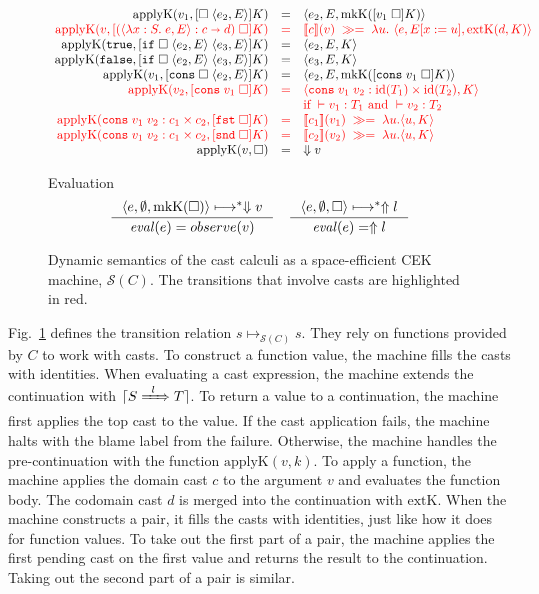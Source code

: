 \documentclass[runningheads]{llncs}
\newcommand{\infr}[2]{\inference{#1}{#2}}
\newcommand{\highlight}[1]{{\color{red} #1}}
\newcommand{\sidecond}[1]{\text{if}\;#1}
\newcommand{\figequalto}[3]{#1 & = & #2 & #3 \\}
\newcommand{\figequaltoH}[3]{\highlight{#1} & \highlight{=} & \highlight{#2} & 
\highlight{#3} \\}
\newcommand{\figref}[1]{Fig.~\ref{#1}}
\newcommand{\SMachine}[1]{\ensuremath{\mathcal{S}(#1)}}
\newcommand{\error}[1]{\ensuremath{\Uparrow#1}}
\newcommand{\Pfunc}[2]{\ensuremath{#1 \shortrightarrow #2}}
\newcommand{\Pprod}[2]{\ensuremath{#1 \times #2}}
\newcommand{\elam}[3]{\lambda#1:#2.\;#3}
\newcommand{\eapp}[2]{#1\;#2}
\newcommand{\eif}[3]{\mathtt{if}\;#1\;#2\;#3}
\newcommand{\econs}[2]{\mathtt{cons} \; #1 \; #2}
\newcommand{\efst}[1]{\mathtt{fst} \; #1}
\newcommand{\esnd}[1]{\mathtt{snd} \; #1}
\newcommand{\ecast}[2]{\ensuremath{#1 : #2}}
\newcommand{\ccast}[3]{#1 \xRightarrow[]{\enskip #2 \enskip} #3}
\newcommand{\vtrue}[0]{\mathtt{true}}
\newcommand{\vfalse}[0]{\mathtt{false}}
\newcommand{\vfunc}[4]{\langle\elam{#1}{#2}{#3},#4\rangle}
\newcommand{\vcons}[2]{\econs{#1}{#2}}
\newcommand{\sexpr}[3]{\ensuremath{\langle#1,#2,#3\rangle}}
\newcommand{\scont}[2]{\ensuremath{\langle#1,#2\rangle}}
\newcommand{\shalt}[1]{\ensuremath{\Downarrow #1}}
\newcommand{\Knil}[0]{\Box}
\newcommand{\Kcons}[2]{[#1]#2}
\newcommand{\closure}[2]{\langle#1,#2\rangle}
\newcommand{\FappXO}[2]{\eapp{\square}{\closure{#1}{#2}}}
\newcommand{\FappOX}[1]{\eapp{#1}{\square}}
\newcommand{\Fif}[3]{\eif{\square}{\closure{#1}{#3}}{\closure{#2}{#3}}}
\newcommand{\FconsXO}[2]{\econs{\square}{\closure{#1}{#2}}}
\newcommand{\FconsOX}[1]{\econs{#1}{\square}}
\newcommand{\Ffst}[0]{\efst{\square}}
\newcommand{\Fsnd}[0]{\esnd{\square}}
\newcommand{\mbind}[0]{\ensuremath{\;\gg=\;}}
\newcommand{\denote}[1]{\ensuremath{\llbracket #1 \rrbracket}}
\newcommand{\translate}[1]{\ensuremath{\lceil#1\rceil}}
\newcommand{\id}[1]{\ensuremath{\mathrm{id}(#1)}}
\newcommand{\mkCont}[1]{\ensuremath{\mathrm{mkK}(#1)}}
\newcommand{\extCont}[2]{\ensuremath{\mathrm{extK}(#1,#2)}}
\newcommand{\applyCont}[2]{\ensuremath{\mathrm{applyK}(#1,#2)}}
\newcommand{\valuetyping}[2]{\ensuremath{\vdash #1 : #2}}
\newcommand{\casttyping}[3]{\ensuremath{\vdash #1 : #2 \Longrightarrow #3}}
\newcommand{\transitivelyreduceto}[2]{\ensuremath{#1 \longmapsto^{*} #2}}
\newcommand{\reducetoS}[3]{\ensuremath{#2 \longmapsto_{\SMachine{#1}} #3}}
\newcommand{\evalto}[2]{\ensuremath{\mathit{eval}(#1)=#2}}
\begin{document}
\begin{figure}
	\fbox{$\applyCont{v}{k}=s$}
	\[
	\begin{array}{rclr}
	\figequalto{\applyCont{v_1}{\Kcons{\FappXO{e_2}{E}}{K}}}{\sexpr{e_2}{E}{
			\mkCont{\Kcons{\FappOX{v_1}}{K}}}
	}{}
	\figequaltoH{
		\applyCont{v}{\Kcons{\FappOX{(\ecast{\vfunc{x}{S}{e}{E}}{\Pfunc{c}{d}})}}{K}}
	}{
		\denote{c}(v) \mbind \lambda u. \
		\sexpr{e}{E[x:=u]}{\extCont{d}{K}}
	}{}
	\figequalto{\applyCont{\vtrue}{\Kcons{\Fif{e_2}{e_3}{E}}{K}}}{\sexpr{e_2}{E}{K}}{}
	\figequalto{\applyCont{\vfalse}{\Kcons{\Fif{e_2}{e_3}{E}}{K}}}{\sexpr{e_3}{E}{K}}{}
	\figequalto{\applyCont{v_1}{\Kcons{\FconsXO{e_2}{E}}{K}}}{
		\sexpr{e_2}{E}{\mkCont{\Kcons{\FconsOX{v_1}}{K}}}
	}{}
	\figequaltoH{\applyCont{v_2}{\Kcons{\FconsOX{v_1}}{K}}}{
		\scont{\ecast{\vcons{v_1}{v_2}}{\Pprod{\id{T_1}}{\id{T_2}}}}{K}
	}{}
	& & 
	\highlight{\sidecond{
		\valuetyping{v_1}{T_1}
		\text{ and }
		\valuetyping{v_2}{T_2}
	}}
	\\
	\figequaltoH{
		\applyCont{\ecast{\vcons{v_1}{v_2}}{\Pprod{c_1}{c_2}}}{\Kcons{\Ffst}{K}}
	}{
		\denote{c_1}(v_1) \mbind \lambda u.
		\scont{u}{K}
	}{}
	\figequaltoH{
		\applyCont{\ecast{\vcons{v_1}{v_2}}{\Pprod{c_1}{c_2}}}{\Kcons{\Fsnd}{K}}
	}{
		\denote{c_2}(v_2) \mbind \lambda u.
		\scont{u}{K}
	}{}
	\figequalto{\applyCont{v}{\Knil}}{\shalt{v}}{}
	\end{array}
	\]
	
	\fbox{\evalto{e}{o}} Evaluation
	\[
	\inference{
		\transitivelyreduceto{\sexpr{e}{\emptyset}{\mkCont{\Knil}}}{\shalt{v}}
	}{
		\evalto{e}{observe(v)}
	} \quad
	\infr{
		\transitivelyreduceto{\sexpr{e}{\emptyset}{\Knil}}{\error{l}}
	}{
		\evalto{e}{\error{l}}}
	\]
	\caption{Dynamic semantics of the cast calculi as a 
	space-efficient CEK	machine, \SMachine{C}. The transitions that involve 
	casts are highlighted
		in red.}
	\label{fig:semachine-dynamics}
\end{figure}

\figref{fig:semachine-dynamics} defines the transition relation 
$\reducetoS{C}{s}{s}$. They rely on functions provided 
by $C$ to work with casts.
%
To construct a function value, the machine fills the casts with identities.
%
When evaluating a cast expression, the machine extends the continuation with 
\translate{\ccast{S}{l}{T}}.
%
To return a value to a continuation, the machine first applies the top cast to 
the value. If the cast application fails, the machine halts with the blame 
label from the failure. Otherwise, the machine handles the pre-continuation 
with the function $\applyCont{v}{k}$.
%
To apply a function, the machine applies the domain cast $c$ to the 
argument $v$ and evaluates the function body. The codomain cast $d$ is merged 
into the continuation with $\mathrm{extK}$.
%
When the machine constructs a pair, it fills the casts with identities, just 
like how it does for function values. 
%
To take out the first part of a pair, the machine applies the first pending 
cast on the first value and returns the result to the continuation.
%
Taking out the second part of a pair is similar.
\end{document}
